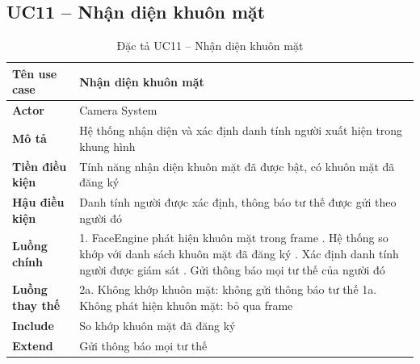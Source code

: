 \subsection*{UC11 -- Nhận diện khuôn mặt}
\begin{table}[H]
    \captionsetup{justification=raggedright, singlelinecheck=false}
    \caption{Đặc tả UC11 -- Nhận diện khuôn mặt}
\centering
\begin{tabular}{|p{3.5cm}|p{10cm}|}
\hline
\textbf{Tên use case} & Nhận diện khuôn mặt \\
\hline
\textbf{Actor} & Camera System \\
\hline
\textbf{Mô tả} & Hệ thống nhận diện và xác định danh tính
  người xuất hiện trong khung hình \\
\hline
\textbf{Tiền điều kiện} & Tính năng nhận diện khuôn mặt
  đã được bật, có khuôn mặt đã đăng ký \\
\hline
\textbf{Hậu điều kiện} & Danh tính người được xác định,
  thông báo tư thế được gửi theo người đó \\
\hline
\textbf{Luồng chính} &
  1. FaceEngine phát hiện khuôn mặt trong frame \newline
  2. Hệ thống so khớp với danh sách khuôn mặt
     đã đăng ký \newline
  3. Xác định danh tính người được giám sát \newline
  4. Gửi thông báo mọi tư thế của người đó \\
\hline
\textbf{Luồng thay thế} &
  2a. Không khớp khuôn mặt: không gửi thông báo
  tư thế \newline
  1a. Không phát hiện khuôn mặt: bỏ qua frame \\
\hline
\textbf{Include} & So khớp khuôn mặt đã đăng ký \\
\hline
\textbf{Extend} & Gửi thông báo mọi tư thế \\
\hline
\end{tabular}
\end{table}

